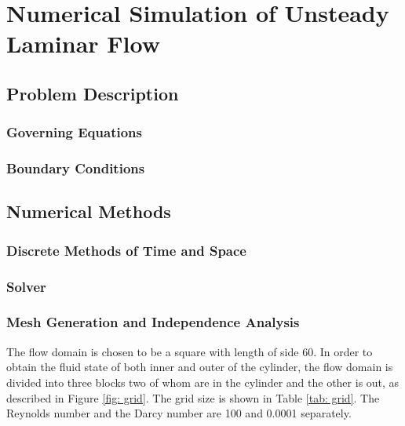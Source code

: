\chapter{Numerical Simulation of Unsteady Laminar Flow}
\section{Problem Description}
\subsection{Governing Equations} %

\subsection{Boundary Conditions} %


\section{Numerical Methods}
\subsection{Discrete Methods of Time and Space}
\subsection{Solver} %
\subsection{Mesh Generation and Independence Analysis}
The flow domain is chosen to be a square with length of side 60. In order to obtain the fluid state of both inner and outer of the cylinder, the flow domain is divided into three blocks two of whom are in the cylinder and the other is out, as described in Figure \ref{fig: grid}. The grid size is shown in Table \ref{tab: grid}. The Reynolds number and the Darcy number are 100 and 0.0001 separately.




